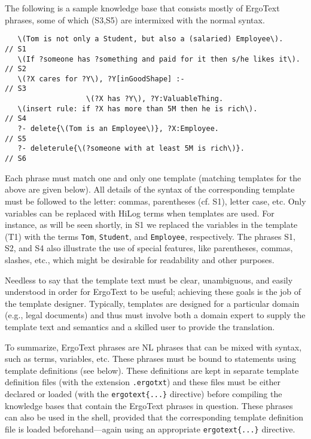 The following is a sample \ERGO knowledge base that consists mostly of
ErgoText phrases, some of which (S3,S5) are intermixed with the normal
\ERGO syntax.
\begin{verbatim}
   \(Tom is not only a Student, but also a (salaried) Employee\).      // S1
   \(If ?someone has ?something and paid for it then s/he likes it\).  // S2
   \(?X cares for ?Y\), ?Y[inGoodShape] :-                             // S3
                   \(?X has ?Y\), ?Y:ValuableThing.
   \(insert rule: if ?X has more than 5M then he is rich\).            // S4
   ?- delete{\(Tom is an Employee\)}, ?X:Employee.                     // S5
   ?- deleterule{\(?someone with at least 5M is rich\)}.               // S6
\end{verbatim}
Each phrase must match one and only one template (matching templates for
the above are given below). All details of the syntax of the corresponding
template must be followed to the letter: commas, parentheses (cf. S1),
letter case, etc. Only variables can be replaced with HiLog terms when
templates are used. For instance, as will be seen shortly, in S1 we replaced the
variables in the template (T1) with the terms \texttt{Tom},
\texttt{Student}, and \texttt{Employee}, respectively.   
The phrases S1, S2, and S4 also illustrate the use of special features, like
parentheses, commas, slashes, etc., which might be desirable for
readability and other purposes.

Needless to say that the template text must be
clear, unambiguous, and easily understood in order for ErgoText to be
useful; achieving these goals is the job of the template designer. Typically, templates
are designed for a particular domain (e.g., legal documents) and thus must
involve both a domain expert to supply the template text and semantics
and a skilled \ERGO user to provide the \ERGO translation.

To summarize, ErgoText phrases are NL phrases that can be mixed
with \FLSYSTEM syntax, such as terms, variables, etc. These phrases must
be bound to \FLSYSTEM statements using template definitions (see
below). These definitions are kept in separate template definition files (with the
extension \texttt{.ergotxt}) and these files must be either declared or
loaded (with the \texttt{ergotext\{...\}} directive) before compiling the
\FLSYSTEM knowledge bases that contain the ErgoText phrases in question.
These phrases can also be used in the \FLSYSTEM shell, provided that the
corresponding template definition file is loaded beforehand---again
using an appropriate \texttt{ergotext\{...\}} directive.

